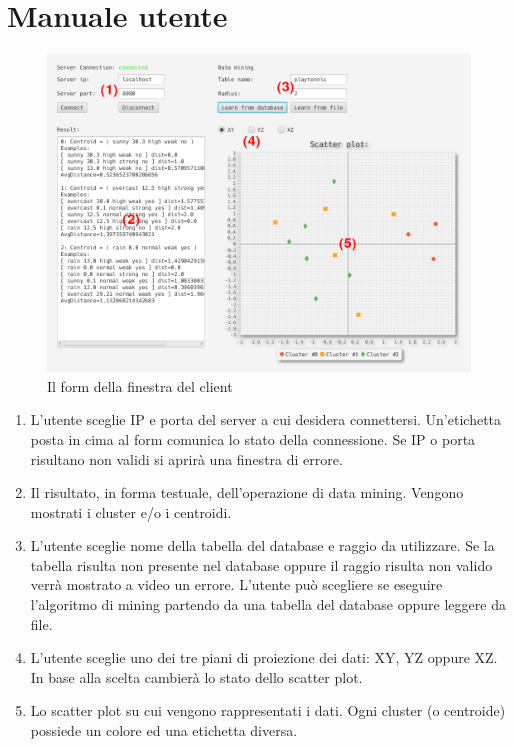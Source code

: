 \documentclass{article}
\begin{document}
	\section{Manuale utente}
	\begin{figure}[h]
		\includegraphics[width=\linewidth]{windowform.png}
		\caption{Il form della finestra del client}
	\end{figure}
	\begin{enumerate}
		\item L'utente sceglie IP e porta del server a cui desidera connettersi.
		Un'etichetta posta in cima al form comunica lo stato della connessione.
		Se IP o porta risultano non validi si aprirà una finestra di errore.
		\item Il risultato, in forma testuale, dell'operazione di data mining.
		Vengono mostrati i cluster e/o i centroidi.
		\item L'utente sceglie nome della tabella del database e raggio da
		utilizzare. Se la tabella risulta non presente nel database oppure il
		raggio risulta non valido verrà mostrato a video un errore. L'utente
		può scegliere se eseguire l'algoritmo di mining partendo da una tabella
		del database oppure leggere da file.
		\item L'utente sceglie uno dei tre piani di proiezione dei dati:
		XY, YZ oppure XZ. In base alla scelta cambierà lo stato dello scatter
		plot.
		\item Lo scatter plot su cui vengono rappresentati i dati. Ogni cluster
		(o centroide) possiede un colore ed una etichetta diversa.
	\end{enumerate}
\end{document}
